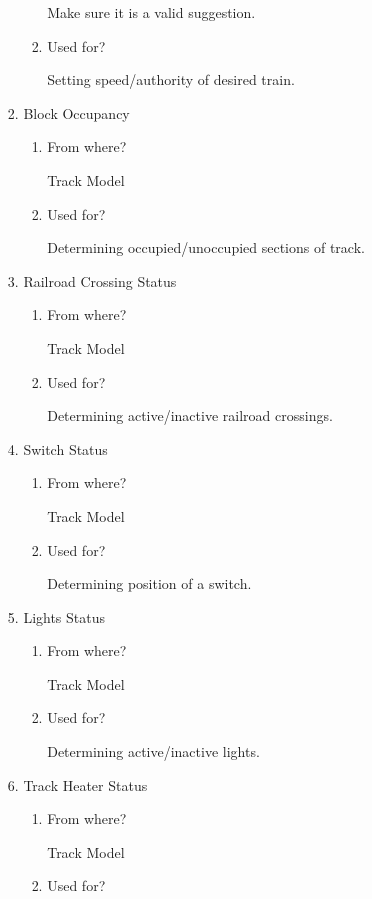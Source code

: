 \documentclass[11pt]{article}
\begin{document}
\begin{enumerate}
\begin{enumerate}
\begin{enumerate}
\begin{enumerate}
Make sure it is a valid suggestion.
\item Used for?
\label{sec-3-1-2-3-1-1-3}

Setting speed/authority of desired train.
\end{enumerate}
\item Block Occupancy
\label{sec-3-1-2-3-1-2}
\begin{enumerate}
\item From where?
\label{sec-3-1-2-3-1-2-1}

Track Model
\item Used for?
\label{sec-3-1-2-3-1-2-2}

Determining occupied/unoccupied sections of track.
\end{enumerate}
\item Railroad Crossing Status
\label{sec-3-1-2-3-1-3}
\begin{enumerate}
\item From where?
\label{sec-3-1-2-3-1-3-1}

Track Model
\item Used for?
\label{sec-3-1-2-3-1-3-2}

Determining active/inactive railroad crossings.
\end{enumerate}
\item Switch Status
\label{sec-3-1-2-3-1-4}
\begin{enumerate}
\item From where?
\label{sec-3-1-2-3-1-4-1}

Track Model
\item Used for?
\label{sec-3-1-2-3-1-4-2}

Determining position of a switch.
\end{enumerate}
\item Lights Status
\label{sec-3-1-2-3-1-5}
\begin{enumerate}
\item From where?
\label{sec-3-1-2-3-1-5-1}

Track Model
\item Used for?
\label{sec-3-1-2-3-1-5-2}

Determining active/inactive lights.
\end{enumerate}
\item Track Heater Status
\label{sec-3-1-2-3-1-6}
\begin{enumerate}
\item From where?
\label{sec-3-1-2-3-1-6-1}

Track Model
\item Used for?
\label{sec-3-1-2-3-1-6-2}


\end{enumerate}
\end{enumerate}
\end{enumerate}
\end{enumerate}
\end{document}
